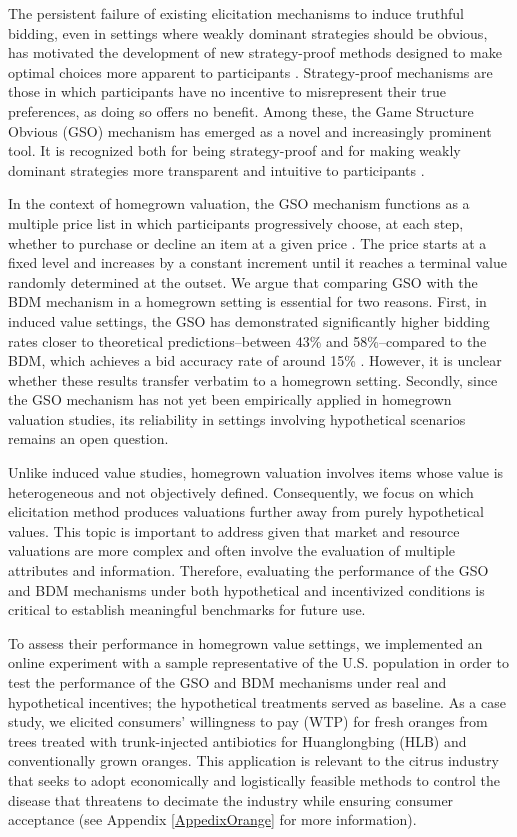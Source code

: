 \documentclass[12pt]{article}
\begin{document}
The persistent failure of existing elicitation mechanisms to induce truthful bidding, even in settings where weakly dominant strategies should be obvious, has motivated the development of new strategy-proof methods designed to make optimal choices more apparent to participants \citep{li_obviously_2017, pycia_theory_2023}. Strategy-proof mechanisms are those in which participants have no incentive to misrepresent their true preferences, as doing so offers no benefit. Among these, the Game Structure Obvious (GSO) mechanism has emerged as a novel and increasingly prominent tool. It is recognized both for being strategy-proof and for making weakly dominant strategies more transparent and intuitive to participants \citep{chakraborty_future_2025}. 

In the context of homegrown valuation, the GSO mechanism functions as a multiple price list in which participants progressively choose, at each step, whether to purchase or decline an item at a given price \citep{yu2021multiple, herberich2012digging, jack2022multiple}.  The price starts at a fixed level and increases by a constant increment until it reaches a terminal value randomly determined at the outset. We argue that comparing GSO with the BDM mechanism in a homegrown setting is essential for two reasons. First, in induced value settings, the GSO  has demonstrated significantly higher bidding rates closer to theoretical predictions--between 43\% and 58\%--compared to the BDM, which achieves a bid accuracy rate of around 15\% \citep{chakraborty_future_2025}. However, it is unclear whether these results transfer verbatim to a homegrown setting. Secondly, since the GSO mechanism has not yet been empirically applied in homegrown valuation studies, its reliability in settings involving hypothetical scenarios remains an open question.

Unlike induced value studies, homegrown valuation involves items whose value is heterogeneous and not objectively defined. Consequently, we focus on which elicitation method produces valuations further away from purely hypothetical values.  This topic is important to address given that market and resource valuations are more complex and often involve the evaluation of multiple attributes and information.  Therefore, evaluating the performance of the GSO and BDM mechanisms under both hypothetical and incentivized conditions is critical to establish meaningful benchmarks for future use. 

To assess their performance in homegrown value settings, we implemented an online experiment with a sample representative of the U.S. population in order to test the performance of the GSO and BDM mechanisms under real and hypothetical incentives; the hypothetical treatments served as baseline. As a case study, we elicited consumers' willingness to pay (WTP) for fresh oranges from trees treated with trunk-injected antibiotics for Huanglongbing (HLB) and conventionally grown oranges. This application is relevant to the citrus industry that seeks to adopt economically and logistically feasible methods to control the disease that threatens to decimate the industry while ensuring consumer acceptance (see Appendix \ref{AppedixOrange} for more information). 
\end{document}
